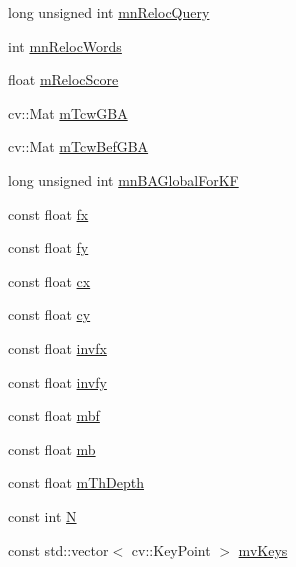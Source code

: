 \begin{DoxyCompactItemize}
\item 
long unsigned int \mbox{\hyperlink{class_o_r_b___s_l_a_m2_1_1_key_frame_a028c2a2f0f737ec09719712c84339748}{mn\+Reloc\+Query}}
\item 
int \mbox{\hyperlink{class_o_r_b___s_l_a_m2_1_1_key_frame_a0b1f8023efe8ddf58ac5d1d2cf41c0cf}{mn\+Reloc\+Words}}
\item 
float \mbox{\hyperlink{class_o_r_b___s_l_a_m2_1_1_key_frame_a78f768a3601ac95f99dff3fd511f2a6e}{m\+Reloc\+Score}}
\item 
cv\+::\+Mat \mbox{\hyperlink{class_o_r_b___s_l_a_m2_1_1_key_frame_ac9bdd885bb078b5e1910c2317e9aa112}{m\+Tcw\+G\+BA}}
\item 
cv\+::\+Mat \mbox{\hyperlink{class_o_r_b___s_l_a_m2_1_1_key_frame_a4a6fb84afa3701dcc6b1e3e76ccb36fa}{m\+Tcw\+Bef\+G\+BA}}
\item 
long unsigned int \mbox{\hyperlink{class_o_r_b___s_l_a_m2_1_1_key_frame_a31b686c81674d0248b5f7dabdfd58ecb}{mn\+B\+A\+Global\+For\+KF}}
\item 
const float \mbox{\hyperlink{class_o_r_b___s_l_a_m2_1_1_key_frame_a951e9ac5670b8543a7386dee5714da0c}{fx}}
\item 
const float \mbox{\hyperlink{class_o_r_b___s_l_a_m2_1_1_key_frame_ab1acd1b8dad098299d350f67dc4517c0}{fy}}
\item 
const float \mbox{\hyperlink{class_o_r_b___s_l_a_m2_1_1_key_frame_a70011d4f3a151dd374c684e258aab4a8}{cx}}
\item 
const float \mbox{\hyperlink{class_o_r_b___s_l_a_m2_1_1_key_frame_ae78735c57b92b2d5960ed21c97dfe6a8}{cy}}
\item 
const float \mbox{\hyperlink{class_o_r_b___s_l_a_m2_1_1_key_frame_a00ce06c4d206f7ddb1daeeb7c43eb074}{invfx}}
\item 
const float \mbox{\hyperlink{class_o_r_b___s_l_a_m2_1_1_key_frame_a7b96f772fad3b9b816dae9f8a719a15d}{invfy}}
\item 
const float \mbox{\hyperlink{class_o_r_b___s_l_a_m2_1_1_key_frame_a5653a9c7ccbb7703a131e0bff11c1f60}{mbf}}
\item 
const float \mbox{\hyperlink{class_o_r_b___s_l_a_m2_1_1_key_frame_a9ad155ef1d46eacccd088a55760926cf}{mb}}
\item 
const float \mbox{\hyperlink{class_o_r_b___s_l_a_m2_1_1_key_frame_a16a3c245370ba4efb5b473059c7f4362}{m\+Th\+Depth}}
\item 
const int \mbox{\hyperlink{class_o_r_b___s_l_a_m2_1_1_key_frame_ac9b6948404d0ade2779335708cd443b9}{N}}
\item 
const std\+::vector$<$ cv\+::\+Key\+Point $>$ \mbox{\hyperlink{class_o_r_b___s_l_a_m2_1_1_key_frame_aa1bcd5810e62ec163a3f38ccb806d04a}{mv\+Keys}}

\end{DoxyCompactItemize}
